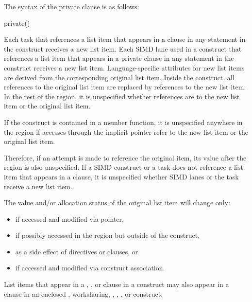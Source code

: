 {{{{\syntax
The syntax of the private clause is as follows:

\begin{boxedcode}
private()
\end{boxedcode}

\descr
Each task that references a list item that appears in a  clause in any statement 
in the construct receives a new list item. Each SIMD lane used in a  construct that 
references a list item that appears in a private clause in any statement in the construct 
receives a new list item. Language-specific attributes for new list items are derived from 
the corresponding original list item. Inside the construct, all references to the original 
list item are replaced by references to the new list item. In the rest of the region, it is 
unspecified whether references are to the new list item or the original list item. 

\cppspecificstart
If the construct is contained in a member function, it is unspecified anywhere in the region if accesses through the implicit  pointer refer to the new list item or the original list item.
\cppspecificend

Therefore, if an attempt is made to reference the original item, its value after the region 
is also unspecified. If a SIMD construct or a task does not reference a list item that 
appears in a  clause, it is unspecified whether SIMD lanes or the task receive 
a new list item. 

The value and/or allocation status of the original list item will change only: 

\begin{itemize}
\item if accessed and modified via pointer, 

\item if possibly accessed in the region but outside of the construct, 

\item as a side effect of directives or clauses, or

\fortranspecificstart
\item if accessed and modified via construct association.
\fortranspecificend
\end{itemize}

List items that appear in a , , or
 clause in a  construct may also appear
in a  clause in an enclosed ,
worksharing, , , , or
 construct.

}}}}
